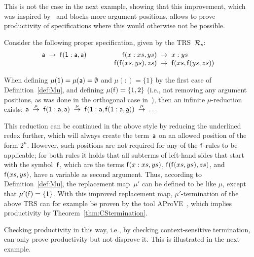 \documentclass{eptcs}
\begin{document}
This is not the case in the next example, showing that this improvement,
which was inspired by~\cite{EH11} and blocks more argument positions,
allows to prove productivity of specifications where this would otherwise not be
possible.

\begin{example}
\label{ex:BlockingMoreArgs}
Consider the following proper specification, given by the TRS~$\mathcal{R}_s$:
\[
\begin{array}{r@{\;\;}c@{\;\;}l@{\qquad\qquad}r@{\;\;}c@{\;\;}l}
\fsym{a} &\to& \fsym{f}(\one : \fsym{a}, \fsym{a})
&
\fsym{f}(x : xs, ys) &\to& x : ys
\\&&&
\fsym{f}(\fsym{f}(xs,ys),zs) &\to& \fsym{f}(xs,\fsym{f}(ys,zs))
\end{array}
\]

When defining $\mu(\mathsf{1}) = \mu(\mathsf{a}) = \emptyset$ and
$\mu(:) = \{ 1 \}$ by the first case of Definition~\ref{def:Mu}, and
defining $\mu(\mathsf{f}) = \{ 1,2 \}$ (i.e., not removing any argument
positions, as was done in the orthogonal case in~\cite{ZR10}),
then an infinite $\mu$-reduction exists:
$
    \mathsf{a} \;\mathrel{\smash{\overset{\mu}{\rightarrow}}}\;
    \mathsf{f}(\mathsf{1} : \mathsf{a}, \mathsf{a}) \;\mathrel{\smash{\overset{\mu}{\rightarrow}}}\;
    \mathsf{f}(\mathsf{1} : \mathsf{a}, \mathsf{f}(\mathsf{1} : \mathsf{a}, \underline{\mathsf{a}}))
    \;\mathrel{\smash{\overset{\mu}{\rightarrow}}}\; \ldots
$

\noindent
This reduction can be continued in the above style by reducing the underlined
redex further, which will always create the term~$\mathsf{a}$ on an allowed
position of the form $2^n$. However, such positions are not required for any
of the $\mathsf{f}$-rules to be applicable; for both rules it holds that all
subterms of left-hand sides that start with the symbol~$\mathsf{f}$,
which are the terms $\mathsf{f}(x : xs, ys)$, $\mathsf{f}(\mathsf{f}(xs,ys),zs)$, and
$\mathsf{f}(xs,ys)$,
have a variable as second argument. Thus, according to Definition~\ref{def:Mu},
the replacement map~$\mu'$ can be defined to be like $\mu$, except that
$\mu'(\mathsf{f}) = \{ 1 \}$.
With this improved replacement map, $\mu'$-termination of the above TRS can for
example be proven by the tool AProVE~\cite{AProVE06},
which implies productivity by Theorem~\ref{thm:CStermination}.
\end{example}

Checking productivity in this way, i.e., by checking context-sensitive
termination, can only prove productivity but not disprove it. This is
illustrated in the next example.
\end{document}
